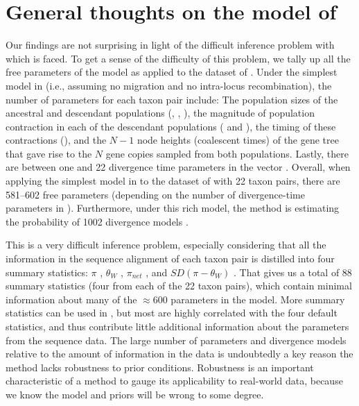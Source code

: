 \section*{General thoughts on the model of \msb}
Our findings are not surprising in light of the difficult inference problem
with which \msb is faced.
To get a sense of the difficulty of this problem, we tally up all the free
parameters of the \msb model as applied to the dataset of \citet{Oaks2012}.
Under the simplest model in \msb (i.e., assuming no migration and no
intra-locus recombination), the number of parameters for each taxon pair
include:
The population sizes of the ancestral and descendant populations
(\ancestralTheta{}, , ),
the magnitude of population contraction in each of the descendant
populations ( and ), the
timing of these contractions (\bottleTime{}), and the $N-1$ node heights
(coalescent times) of the gene tree that gave rise to the $N$ gene
copies sampled from both populations.
Lastly, there are between one and 22 divergence time parameters \divt{} in
the vector \divtvector.
Overall, when applying the simplest model in \msb to the dataset of
\citet{Oaks2012} with 22 taxon pairs, there are 581--602 free parameters
(depending on the number of divergence-time parameters in \divtvector).
Furthermore, under this rich model, the method is estimating the probability of
1002 divergence models \citep[i.e., the number of integer partitions of
$Y=22$;][]{Oaks2012}.

This is a very difficult inference problem, especially considering that all the
information in the sequence alignment of each taxon pair is distilled into four
summary statistics:
$\pi$ \citep{Tajima1983}, $\theta_W$ \citep{Watterson1975}, $\pi_{net}$
\citep{Takahata1985}, and $SD(\pi-\theta_W)$ \citep{Tajima1989}.
That gives us a total of 88 summary statistics (four from each of the 22 taxon
pairs), which contain minimal information about many of the $\approx 600$
parameters in the model.
More summary statistics can be used in \msb, but most are highly correlated
with the four default statistics, and thus contribute little additional
information about the parameters from the sequence data.
The large number of parameters and divergence models relative to the amount of
information in the data is undoubtedly a key reason the method lacks robustness
to prior conditions.
Robustness is an important characteristic of a method to gauge its
applicability to real-world data, because we know the model and priors will be
wrong to some degree.

